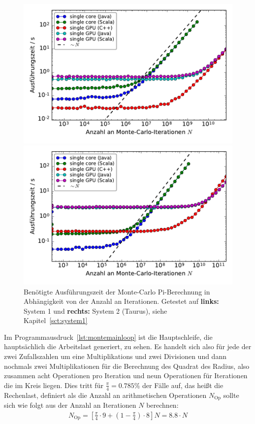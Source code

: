 \documentclass[german,bibnum,beleg,zihtitle,german,hyperref,utf8]{zihpub}
\begin{document}
\begin{figure}[H]
	\centering
	\begin{minipage}{0.5\linewidth}
		\includegraphics[width=\linewidth]{benchmarks-workload-scaling}
	\end{minipage}\begin{minipage}{0.5\linewidth}
		\includegraphics[width=\linewidth]{benchmarks-workload-scaling-taurus2}
	\end{minipage}
	\caption{Benötigte Ausführungszeit der Monte-Carlo Pi-Berechnung in Abhängigkeit von der Anzahl an Iterationen. Getestet auf \textbf{links:} System 1 und \textbf{rechts:} System 2 (Taurus), siehe Kapitel~\ref{sct:system1}}
	\label{fig:montepiworkloadscaling}
\end{figure}
Im Programmausdruck~\ref{lst:montemainloop} ist die Hauptschleife, die hauptsächlich die Arbeitslast generiert, zu sehen. Es handelt sich also für jede der zwei Zufallszahlen um eine Multiplikations und zwei Divisionen und dann nochmals zwei Multiplikationen für die Berechnung des Quadrat des Radius, also zusammen acht Operationen pro Iteration und neun Operationen für Iterationen die im Kreis liegen. Dies tritt für $\frac{\pi}{4}=0.785\%$ der Fälle auf, das heißt die Rechenlast, definiert als die Anzahl an arithmetischen Operationen $N_\text{Op}$ sollte sich wie folgt aus der Anzahl an Iterationen $N$ berechnen:
\begin{align}
	N_\text{Op}
	= \left[ \frac{\pi}{4}\cdot 9 + \left( 1-\frac{\pi}{4} \right)\cdot 8 \right] N
	= 8.8\cdot N
\end{align}
\end{document}
